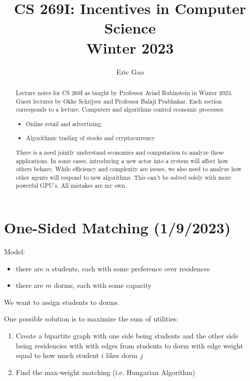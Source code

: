 \documentclass[dvipsnames]{article}
\title{CS 269I: Incentives in Computer Science \\
Winter 2023}
\author{Eric Gao}
\date{}
\theoremstyle{definition}
\theoremstyle{remark}
\newenvironment{mech}[1]{\begin{tcolorbox}[colback=red!5!white,colframe=red!75!black,title={#1}]}{\end{tcolorbox}}
\begin{document}
\maketitle

\begin{abstract}
	Lecture notes for CS 269I as taught by Professor Aviad Rubinstein in Winter 2023. Guest lectures by Okke Schrijver and Professor Balaji Prabhakar. Each section corresponds to a lecture. Computers and algorithms control economic processes:
	\begin{itemize}
		\item Online retail and advertising;
		\item Algorithmic trading of stocks and cryptocurrency
	\end{itemize}
	There is a need jointly understand economics and computation to analyze these applications. In some cases, introducing a new actor into a system will affect how others behave. While efficiency and complexity are issues, we also need to analyze how other agents will respond to new algorithms. This can't be solved solely with more powerful GPU's. All mistakes are my own. 
\end{abstract}

\tableofcontents

\newpage

\section{One-Sided Matching (1/9/2023)}

Model:
\begin{itemize}
	\item there are $n$ students, each with some preference over residences 
	\item there are $m$ dorms, each with some capacity
\end{itemize}
We want to assign students to dorms.

One possible solution is to maximize the sum of utilities:
\begin{mech}{Utility Maximization}
\begin{enumerate}
	\item Create a bipartite graph with one side being students and the other side being residencies with with edges from students to dorm with edge weight equal to how much student $i$ likes dorm $j$
	\item Find the max-weight matching (i.e. Hungarian Algorithm)
\end{enumerate}
\end{mech}
\end{document}
